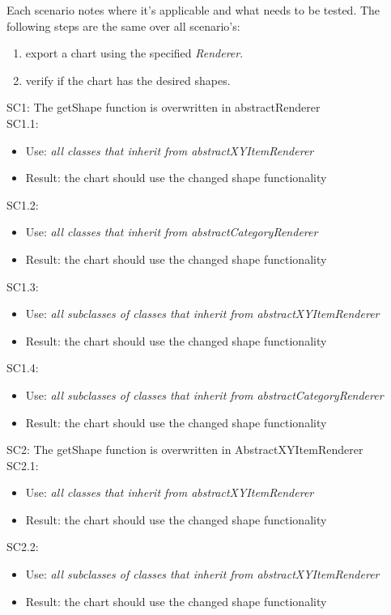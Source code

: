 \documentclass{article}
\begin{document}
Each scenario notes where it's applicable and what needs to be tested.
The following steps are the same over all scenario's:\\
\begin{enumerate}
	\item export a chart using the specified \textit{Renderer}.
	\item verify if the chart has the desired shapes.
\end{enumerate}
SC1: The getShape function is overwritten in abstractRenderer\\
SC1.1: 
\begin{itemize}
	\item Use: \textit{all classes that inherit from abstractXYItemRenderer}
	\item Result: the chart should use the changed shape functionality
\end{itemize}
SC1.2: 
\begin{itemize}
	\item Use: \textit{all classes that inherit from abstractCategoryRenderer}
	\item Result: the chart should use the changed shape functionality
\end{itemize}
SC1.3:
\begin{itemize}
	\item Use: \textit{all subclasses of classes that inherit from abstractXYItemRenderer}
	\item Result: the chart should use the changed shape functionality
\end{itemize}
SC1.4:
\begin{itemize}
	\item Use: \textit{all subclasses of classes that inherit from abstractCategoryRenderer}
	\item Result: the chart should use the changed shape functionality
\end{itemize}
SC2: The getShape function is overwritten in AbstractXYItemRenderer\\
SC2.1: 
\begin{itemize}
	\item Use: \textit{all classes that inherit from abstractXYItemRenderer}
	\item Result: the chart should use the changed shape functionality
\end{itemize}
SC2.2: 
\begin{itemize}
	\item Use: \textit{all subclasses of classes that inherit from abstractXYItemRenderer}
	\item Result: the chart should use the changed shape functionality
\end{itemize}
\end{document}
